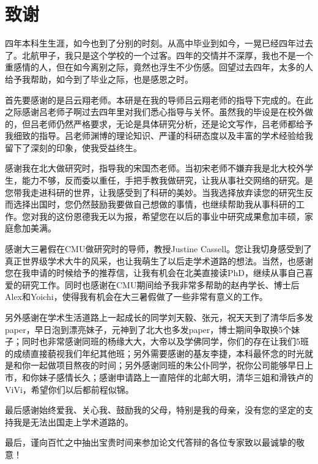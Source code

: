 \chapter*{致谢}

\qquad 四年本科生生涯，如今也到了分别的时刻。从高中毕业到如今，一晃已经四年过去了。北航甲子，我只是这个学校的一个过客。四年的交情并不深厚，我也不是一个重感情的人，但在如今离别之际，竟然也浮生不少伤感。回望过去四年，太多的人给予我帮助，如今到了毕业之际，也是感恩之时。

首先要感谢的是吕云翔老师。本研是在我的导师吕云翔老师的指导下完成的。在此之际感谢吕老师子啊过去四年里对我们悉心指导与关怀。虽然我的毕设是在校外做的，但吕老师仍然严格要求，无论是具体研究分析，还是论文写作，吕老师都给予我细致的指导。吕老师渊博的理论知识、严谨的科研态度以及丰富的学术经验给我留下了深刻的印象，使我受益终生。

感谢我在北大做研究时，指导我的宋国杰老师。当初宋老师不嫌弃我是北大校外学生，能力不够，反而委以重任，手把手教我做研究，让我从事社交网络的研究。是您带我走进科研的世界，让我感受到了科研的美妙。当我选择放弃读您的研究生反而选择出国时，您仍然鼓励我要做自己想做的事情，也继续帮助我从事科研的工作。您对我的这份恩德我无以为报，希望您在以后的事业中研究成果愈加丰硕，家庭愈加美满。

感谢大三暑假在CMU做研究时的导师，教授Justine Cassell。您让我切身感受到了真正世界级学术大牛的风采，也让我萌生了以后走学术道路的想法。当然，也感谢您在我申请的时候给予的推荐信，让我有机会在北美直接读PhD，继续从事自己喜爱的研究工作。同时也感谢在CMU期间给予我非常多帮助的赵冉学长、博士后Alex和Yoichi，使得我有机会在大三暑假做了一些非常有意义的工作。


另外感谢在学术生活道路上一起成长的同学刘天毅、张元，祝天天到了清华后多发paper，早日泡到漂亮妹子，元神到了北大也多发paper，博士期间争取换5个妹子；同时也非常感谢同班的杨缘大大，大帝以及学佛同学，你们的存在让我们5班的成绩直接藐视我们年纪其他班；另外需要感谢的基友李捷，本科最怀念的时光就是和你一起做项目熬夜的时间；另外感谢同班的朱公仆同学，祝你公司能够早日上市，和你妹子感情长久；感谢申请路上一直陪伴的北邮大明，清华三姐和滑铁卢的ViVi，希望你们以后都前程似锦。


最后感谢始终爱我、关心我、鼓励我的父母，特别是我的母亲，没有您的坚定的支持我是无法出国走上学术道路的。

最后，谨向百忙之中抽出宝贵时间来参加论文代答辩的各位专家致以最诚挚的敬意！
















\cleardoublepage

